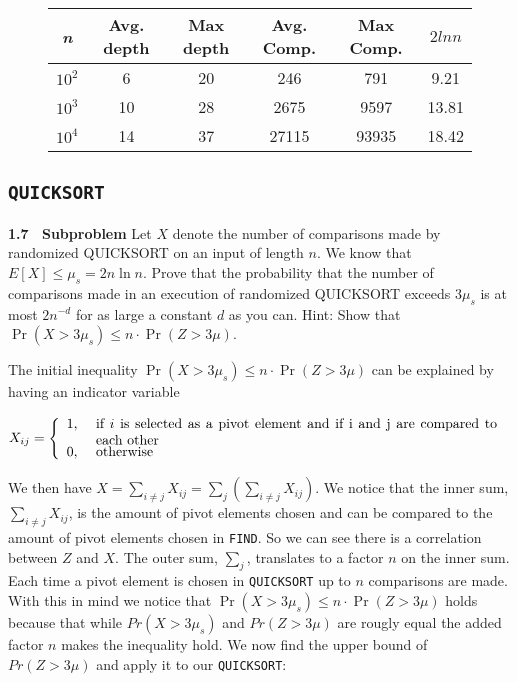 \documentclass[article,a4paper,oneside]{article}
\newcommand{\+}[1]{\ensuremath{\boldsymbol{#1}}}
\begin{document}
\begin{center}
\begin{figure}
\begin{tabular}{| c | c | c | c | c | c |}
\hline
\emph{n} & Avg. depth & Max depth & Avg. Comp. & Max Comp. & $2lnn$\\ \hline
$10^2$ & 6 & 20 & 246 & 791 & 9.21 \\ \hline
$10^3$ & 10 & 28 & 2675 & 9597 & 13.81 \\ \hline
$10^4$ & 14 & 37 & 27115 & 93935 & 18.42\\ \hline
\end{tabular}	
\label{table:find}
\end{figure}
\end{center}
\subsection*{\texttt{QUICKSORT}}

{\bf 1.7 \ Subproblem} Let $X$ denote the number of comparisons made by
randomized QUICKSORT on an input of length $n$. We know that $E[X]
\leq \mu_s= 2n\ln n$.  Prove that the probability that the number of
comparisons made in an execution of randomized QUICKSORT exceeds
$3\mu_s$ is at most $2n^{-d}$ for as large a constant $d$ as you can.
Hint: Show that $\Pr(X>3\mu_s)\leq n\cdot\Pr(Z>3\mu)$.

The initial inequality $\Pr(X>3\mu_s)\leq n\cdot\Pr(Z>3\mu)$ can be explained by having an indicator variable

$$X_{ij}=\left\{\begin{array}{ll}
1, & \mbox{
\begin{minipage}[t]{4in}
  if $i$ is selected as a pivot element and if i and j are compared to each other 
\end{minipage}
}
\\
0, & \mbox{ otherwise}
\end{array}\right.$$

We then have $X = \sum_{i \neq j} X_{ij} = \sum_j \left( \sum_{i \neq j} X_{ij} \right)$. We notice that the inner sum, $ \sum_{i \neq j} X_{ij}$, is the amount of pivot elements chosen and can be compared to the amount of pivot elements chosen in \texttt{FIND}. So we can see there is a correlation between $Z$ and $X$. The outer sum, $\sum_j$, translates to a factor $n$ on the inner sum. Each time a pivot element is chosen in \texttt{QUICKSORT} up to $n$ comparisons are made. With this in mind we notice that $\Pr(X>3\mu_s)\leq n\cdot\Pr(Z>3\mu)$ holds because that while $Pr(X > 3\mu_s)$ and $Pr(Z > 3\mu)$ are rougly equal the added factor $n$ makes the inequality hold. We now find the upper bound of $Pr(Z > 3\mu)$ and apply it to our \texttt{QUICKSORT}:
\end{document}
